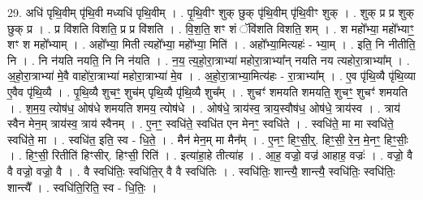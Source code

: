\documentclass[17pt]{extarticle}
\begin{document}
29. अधि॑ पृथि॒वीम् पृ॑थि॒वी मध्यधि॑ पृथि॒वीम् । . पृ॒थि॒वीꣳ शुक् छुक् पृ॑थि॒वीम् पृ॑थि॒वीꣳ शुक् । . शुक् प्र प्र शुक् छुक् प्र । . प्र वि॑शति विशति॒ प्र प्र वि॑शति । . वि॒श॒ति॒ शꣳ शं ॅवि॑शति विशति॒ शम् । . श महो᳚भ्या॒ महो᳚भ्याꣳ॒॒ शꣳ श महो᳚भ्याम् । . अहो᳚भ्या॒ मिती त्यहो᳚भ्या॒ महो᳚भ्या॒ मिति॑ । . अहो᳚भ्या॒मित्यहः॑ - भ्या॒म् । . इति॒ नि नीतीति॒ नि । . नि न॑यति नयति॒ नि नि न॑यति । . न॒य॒ त्य॒हो॒रा॒त्राभ्या॑ महोरा॒त्राभ्या᳚न् नयति नय त्यहोरा॒त्राभ्या᳚म् । . अ॒हो॒रा॒त्राभ्या॑ मे॒वै वाहो॑रा॒त्राभ्या॑ महोरा॒त्राभ्या॑ मे॒व । . अ॒हो॒रा॒त्राभ्या॒मित्य॑हः - रा॒त्राभ्या᳚म् । . ए॒व पृ॑थि॒व्यै पृ॑थि॒व्या ए॒वैव पृ॑थि॒व्यै । . पृ॒थि॒व्यै शुचꣳ॒॒ शुच॑म् पृथि॒व्यै पृ॑थि॒व्यै शुच᳚म् । . शुचꣳ॑ शमयति शमयति॒ शुचꣳ॒॒ शुचꣳ॑ शमयति । . श॒म॒य॒ त्योष॑ध॒ ओष॑धे शमयति शमय॒ त्योष॑धे । . ओष॑धे॒ त्राय॑स्व॒ त्राय॒स्वौष॑ध॒ ओष॑धे॒ त्राय॑स्व । . त्राय॑ स्वैन मेन॒म् त्राय॑स्व॒ त्राय॑ स्वैनम् । . ए॒नꣳ॒॒ स्वधि॑ते॒ स्वधि॑त एन मेनꣳ॒॒ स्वधि॑ते । . स्वधि॑ते॒ मा मा स्वधि॑ते॒ स्वधि॑ते॒ मा । . स्वधि॑त॒ इति॒ स्व - धि॒ते॒ । . मैन॑ मेन॒म् मा मैन᳚म् । . ए॒नꣳ॒॒ हिꣳ॒॒सी॒र्॒. हिꣳ॒॒सी॒ रे॒न॒ मे॒नꣳ॒॒ हिꣳ॒॒सीः॒ । . हिꣳ॒॒सी॒ रितीति॑ हिꣳसीर्. हिꣳसी॒ रिति॑ । . इत्या॑हा॒हे तीत्या॑ह । . आ॒ह॒ वज्रो॒ वज्र॑ आहाह॒ वज्रः॑ । . वज्रो॒ वै वै वज्रो॒ वज्रो॒ वै । . वै स्वधि॑तिः॒ स्वधि॑ति॒र् वै वै स्वधि॑तिः । . स्वधि॑तिः॒ शान्त्यै॒ शान्त्यै॒ स्वधि॑तिः॒ स्वधि॑तिः॒ शान्त्यै᳚ । . स्वधि॑ति॒रिति॒ स्व - धि॒तिः॒ । \newline
\end{document}
